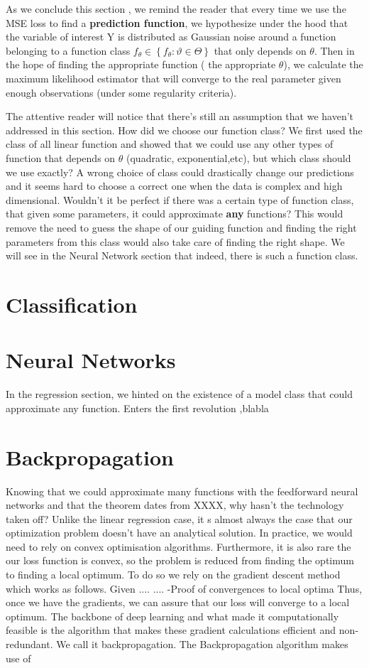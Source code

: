 As we conclude this section , we remind the reader that every time we use the MSE loss to find a \textbf{prediction function}, we hypothesize under the hood that the variable of interest Y is distributed as Gaussian noise around a function belonging to a function class $f_{\theta} \in\left\{f_{\theta}: \vartheta \in \Theta\right\}$  that only depends on $\theta$. Then in the hope of finding the appropriate function ( the appropriate $\theta$), we calculate the maximum likelihood estimator that will converge to the real parameter given enough observations (under some regularity criteria).

The attentive reader will notice that there's still an assumption that we haven't addressed in this section. How did we choose our function class? We first used the class of all linear function and showed that we could use any other types of function that depends on $\theta$ (quadratic, exponential,etc), but which class should we use exactly? A wrong choice of class could drastically change our predictions and it seems hard to choose a correct one when the data is complex and high dimensional.  Wouldn't it be perfect if there was a certain type of function class, that given some parameters, it could approximate \textbf{any} functions? This would remove the need to guess the shape of our guiding function and finding the right parameters from this class would also take care of finding the right shape. We will see in the Neural Network section that indeed, there is such a function class.



\section{Classification}
\section {Neural Networks}
In the regression section, we hinted on the existence of a model class that could approximate any function. Enters the first revolution ,blabla
\section{Backpropagation}
Knowing that we could approximate many functions with the feedforward neural networks and that the theorem dates from XXXX, why hasn't the technology taken off? Unlike the linear regression case, it  s almost always the case that our optimization problem doesn't have an analytical solution. In practice, we would need to rely on convex optimisation algorithms. Furthermore, it is also rare the our loss function is convex, so the problem is reduced from finding the optimum to finding a local optimum. To do so we rely on the gradient descent method which works as follows. Given ....
....
-Proof of convergences to local optima
Thus, once we have the gradients, we can assure that our loss will converge to a local optimum. The backbone of deep learning and what made it computationally feasible is the algorithm that makes these gradient calculations efficient and non-redundant. We call it backpropagation. The Backpropagation algorithm makes use of

